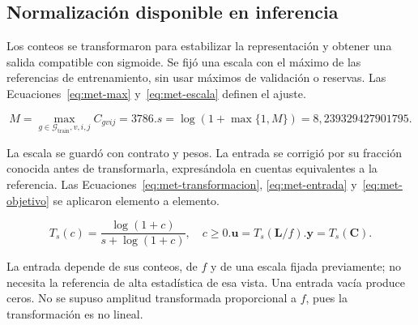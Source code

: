 \subsection{Normalización disponible en inferencia}\label{subsec:met-preprocesamiento}
Los conteos se transformaron para estabilizar la representación y obtener una salida compatible con sigmoide. Se fijó una escala con el máximo de las referencias de entrenamiento, sin usar máximos de validación o reservas. Las Ecuaciones~\eqref{eq:met-max} y~\eqref{eq:met-escala} definen el ajuste.
\begin{samepage}
\begin{subequations}
\begin{equation}M=\max_{g\in\mathcal G_{\mathrm{train}},v,i,j}C_{gvij}=3786.\label{eq:met-max}\end{equation}
\begin{equation}s=\log(1+\max\{1,M\})=8{,}239329427901795.\label{eq:met-escala}\end{equation}
\end{subequations}
\end{samepage}
La escala se guardó con contrato y pesos. La entrada se corrigió por su fracción conocida antes de transformarla, expresándola en cuentas equivalentes a la referencia. Las Ecuaciones~\eqref{eq:met-transformacion}, \eqref{eq:met-entrada} y~\eqref{eq:met-objetivo} se aplicaron elemento a elemento.
\begin{samepage}
\begin{subequations}
\begin{equation}T_s(c)=\frac{\log(1+c)}{s+\log(1+c)},\quad c\geq0.\label{eq:met-transformacion}\end{equation}
\begin{equation}\boldsymbol u=T_s(\boldsymbol L/f).\label{eq:met-entrada}\end{equation}
\begin{equation}\boldsymbol y=T_s(\boldsymbol C).\label{eq:met-objetivo}\end{equation}
\end{subequations}
\end{samepage}
La entrada depende de sus conteos, de $f$ y de una escala fijada previamente; no necesita la referencia de alta estadística de esa vista. Una entrada vacía produce ceros. No se supuso amplitud transformada proporcional a $f$, pues la transformación es no lineal.

